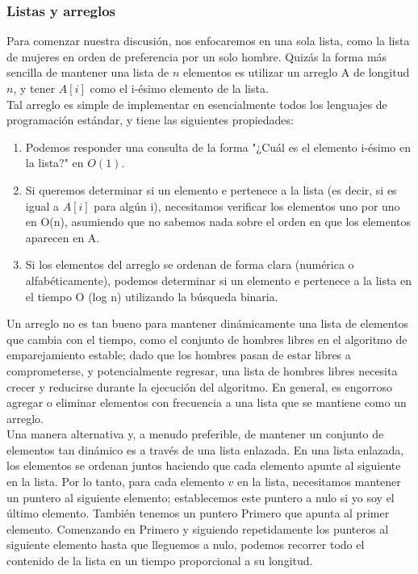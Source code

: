 \documentclass[a4paper, 12pt]{book}
\begin{document}
\subsubsection*{Listas y arreglos}


Para comenzar nuestra discusión, nos enfocaremos en una sola lista, como la lista de mujeres en orden de preferencia por un solo hombre. Quizás la forma más sencilla de mantener una lista de $n$ elementos es utilizar un arreglo A de longitud $n$, y tener $A[i]$ como el i-ésimo elemento de la lista. \\ 

Tal arreglo es simple de implementar en esencialmente todos los lenguajes de programación estándar, y tiene las siguientes propiedades:\\

\begin{enumerate}
    \item  Podemos responder una consulta de la forma "¿Cuál es el elemento i-ésimo en la lista?" en $O(1)$.
    \item Si queremos determinar si un elemento e pertenece a la lista (es decir, si es igual a $A[i]$ para algún
i), necesitamos verificar los elementos uno por uno en O(n), asumiendo que no sabemos nada sobre
el orden en que los elementos aparecen en A.
    \item  Si los elementos del arreglo se ordenan de forma clara (numérica o alfabéticamente), podemos
determinar si un elemento e pertenece a la lista en el tiempo O (log n) utilizando la búsqueda
binaria.
   \end{enumerate}

Un arreglo no es tan bueno para mantener dinámicamente una lista de elementos que cambia con el tiempo, como el conjunto de hombres libres en el algoritmo de emparejamiento estable; dado que los hombres pasan de estar libres a comprometerse, y potencialmente regresar, una lista de hombres libres necesita crecer y reducirse durante la ejecución del algoritmo. En general, es engorroso agregar o eliminar elementos con frecuencia a una lista que se mantiene como un arreglo. \\

Una manera alternativa y, a menudo preferible, de mantener un conjunto de elementos tan dinámico es a través de una lista enlazada. En una lista enlazada, los elementos se ordenan juntos haciendo que cada elemento apunte al siguiente en la lista. Por lo tanto, para cada elemento $v$ en la lista, necesitamos mantener un puntero al siguiente elemento; establecemos este puntero a nulo si yo soy el último elemento. También tenemos un puntero Primero que apunta al primer elemento. Comenzando en Primero y siguiendo repetidamente los punteros al siguiente elemento hasta que lleguemos a nulo, podemos recorrer todo el contenido de la lista en un tiempo proporcional a su longitud. \\
\end{document}
